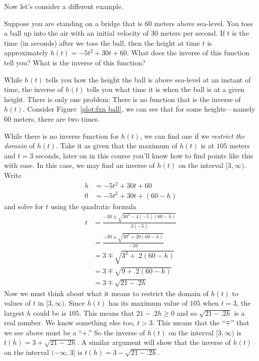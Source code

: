Now let's consider a different example.

\begin{example}\label{E:example-ball-bridge}
Suppose you are standing on a bridge that is 60 meters above
sea-level. You toss a ball up into the air with an initial velocity of
30 meters per second.  If $t$ is the time (in seconds) after we toss
the ball, then the height at time $t$ is approximately $h(t) = -5 t^2
+30t+60$. What does the inverse of this function tell you? What is the inverse
of this function?
\end{example}


\begin{solution}
While $h(t)$ tells you how the height the ball is above sea-level at an
instant of time, the inverse of $h(t)$ tells you what time it is when
the ball is at a given height. There is only one problem: There is no
function that is the inverse of $h(t)$. Consider Figure~\ref{plot:fxn
  ball}, we can see that for some heights---namely 60 meters, there
are two times. 

While there is no inverse function for $h(t)$, we can find one if we
\textit{restrict the domain} of $h(t)$. Take it as given that the
maximum of $h(t)$ is at $105$ meters and $t=3$ seconds, later on in
this course you'll know how to find points like this with ease. In
this case, we may find an inverse of $h(t)$ on the interval
$[3,\infty)$. Write
\begin{align*}
h &=  -5 t^2 +30t+60\\
0 &= -5 t^2 +30t+(60 - h)
\end{align*}
and solve for $t$ using the quadratic formula
\begin{align*}
t &= \frac{-30\pm \sqrt{30^2 -4(-5)(60-h)}}{2(-5)}\\
&= \frac{-30\pm \sqrt{30^2 +20(60-h)}}{-10}\\
&=3\mp \sqrt{3^2+ .2(60-h)}\\
&=3\mp \sqrt{9+ .2(60-h)}\\
&=3\mp \sqrt{21-.2h}
\end{align*}
Now we must think about what it means to restrict the domain of $h(t)$
to values of $t$ in $[3,\infty)$. Since $h(t)$ has its maximum value
  of $105$ when $t=3$, the largest $h$ could be is $105$. This means
  that $21-.2h \ge 0$ and so $\sqrt{21-.2h}$ is a real number. We know
  something else too, $t>3$. This means that the ``$\mp$'' that we see
  above must be a ``$+$.''  So the inverse of $h(t)$ on the interval
  $[3,\infty)$ is $t(h) = 3+ \sqrt{21-.2h}$. A similar argument will
    show that the inverse of $h(t)$ on the interval $(-\infty, 3]$ is
  $t(h) = 3- \sqrt{21-.2h}$.
\end{solution}

